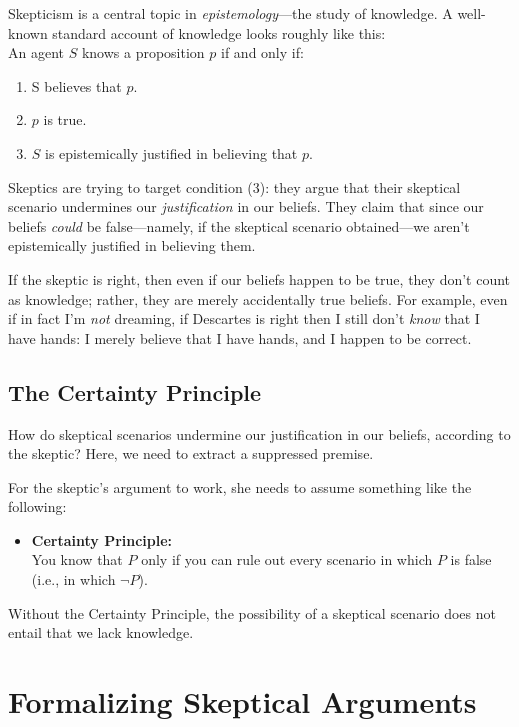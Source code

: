 \documentclass[english, a4paper]{article}
\begin{document}
Skepticism is a central topic in \textit{epistemology}---the study of knowledge. A well-known standard account of knowledge looks roughly like this:\\

An agent $S$ knows a proposition $p$ if and only if:
\begin{enumerate}
	\item S believes that $p$.
	\item $p$ is true.
	\item $S$ is epistemically justified in believing that $p$.
\end{enumerate}

Skeptics are trying to target condition (3): they argue that their skeptical scenario undermines our \textit{justification} in our beliefs. They claim that since our beliefs \textit{could} be false---namely, if the skeptical scenario obtained---we aren't epistemically justified in believing them.

If the skeptic is right, then even if our beliefs happen to be true, they don't count as knowledge; rather, they are merely accidentally true beliefs. For example, even if in fact I'm \textit{not} dreaming, if Descartes is right then I still don't \textit{know} that I have hands: I merely believe that I have hands, and I happen to be correct.

\subsection*{The Certainty Principle}

How do skeptical scenarios undermine our justification in our beliefs, according to the skeptic? Here, we need to extract a suppressed premise.

For the skeptic's argument to work, she needs to assume something like the following:

\begin{itemize}
	\item[] \textbf{Certainty Principle:}\\[4pt] You know that $P$ only if you can rule out every scenario in which $P$ is false (i.e., in which $\neg P$).
\end{itemize}

Without the Certainty Principle, the possibility of a skeptical scenario does not entail that we lack knowledge.

\section{Formalizing Skeptical Arguments}
\end{document}
